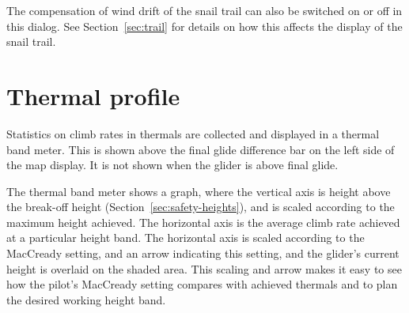 The compensation of wind drift of the snail trail can also be switched
on or off in this dialog.  See Section~\ref{sec:trail} for details on
how this affects the display of the snail trail.

\section{Thermal profile}

Statistics on climb rates in thermals are collected and displayed in a
thermal band meter.  This is shown above the final glide difference
bar on the left side of the map display.  It is not shown when the
glider is above final glide.  

\vskip 2cm

The thermal band meter shows a graph, where the vertical axis is
height above the break-off height (Section~\ref{sec:safety-heights}), and is
scaled according to the maximum height achieved.  The horizontal axis is the average climb
rate achieved at a particular height band.  The horizontal axis is
scaled according to the MacCready setting, and an arrow indicating this
setting, and the glider's current height is overlaid on the shaded
area.  This scaling and arrow makes it easy to see how the pilot's
MacCready setting compares with achieved thermals and to plan the
desired working height band.


